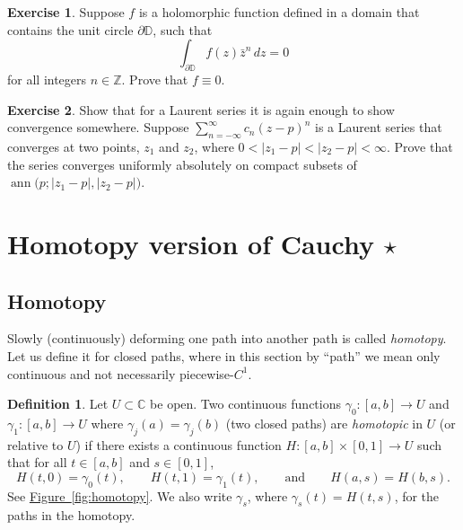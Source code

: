 \documentclass[12pt,openany]{book}
\newcommand{\ann}{\operatorname{ann}}
\newcommand{\sabs}[1]{\lvert {#1} \rvert}
\newcommand{\C}{{\mathbb{C}}}
\newcommand{\Z}{{\mathbb{Z}}}
\newcommand{\D}{{\mathbb{D}}}
\newcommand{\myindex}[1]{#1\index{#1}}
\newcommand{\myquote}[1]{``#1''}
\theoremstyle{plain}
\theoremstyle{remark}
\theoremstyle{definition}
\newtheorem{defn}[thm]{Definition}
\newenvironment{exbox}{%
    \def\FrameCommand{\vrule width 1pt \relax\hspace{10pt}}%
    \MakeFramed{\advance\hsize-\width\FrameRestore}%
}{%
    \endMakeFramed
}
\theoremstyle{exercise}
\newtheorem{exercise}{Exercise}[section]
\theoremstyle{example}
\newcommand{\figureref}[1]{\hyperref[#1]{Figure~\ref*{#1}}}
\begin{document}
\begin{exbox}
\begin{exercise}
Suppose $f$ is a holomorphic function defined in a domain that contains
the unit circle $\partial \D$, such that
\begin{equation*}
\int_{\partial \D} f(z)\bar{z}^n
 \, dz = 0
\end{equation*}
for all integers $n \in \Z$.  Prove that $f \equiv 0$.
\end{exercise}

\begin{exercise}
Show that for a Laurent series it is again enough to show convergence
somewhere.  Suppose $\sum_{n=-\infty}^\infty c_n {(z-p)}^n$ is a Laurent
series that converges at two points, $z_1$ and $z_2$, where
$0 < \sabs{z_1-p} < \sabs{z_2-p} < \infty$.
Prove that the series converges uniformly absolutely on compact subsets
of $\ann\bigl(p;\sabs{z_1-p},\sabs{z_2-p}\bigr)$.
\end{exercise}
\end{exbox}


\section{Homotopy version of Cauchy \texorpdfstring{$\star$}{*}}

\subsection{Homotopy}

Slowly (continuously) deforming one path into another path
is called \emph{\myindex{homotopy}}.  Let us
define it for closed paths,
where in this section by \myquote{path} we mean only
continuous and not necessarily piecewise-\(C^1 .\)

\begin{defn}\label{defn:homotopy}
Let $U \subset \C$ be open.
Two continuous functions
$\gamma_0 \colon [a,b] \to U$ and
$\gamma_1 \colon [a,b] \to U$
where $\gamma_j(a)=\gamma_j(b)$ (two closed paths)
are \emph{\myindex{homotopic}} in $U$
(or relative to $U$) if there exists a continuous function
$H \colon [a,b] \times [0,1] \to U$ such that
for all $t \in [a,b]$ and $s \in [0,1]$,
\begin{equation*}
H(t,0) = \gamma_0(t), \qquad
H(t,1) = \gamma_1(t), \qquad \text{and} \qquad
H(a,s) = H(b,s) .
\end{equation*}
See \figureref{fig:homotopy}.
We also write $\gamma_s$, where $\gamma_s(t) = H(t,s)$, for the paths in the homotopy.
\end{defn}
\end{document}
